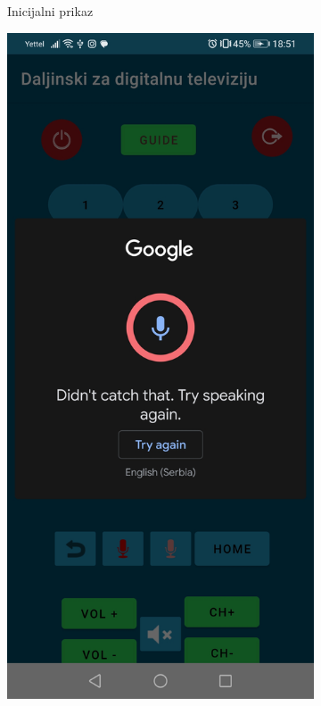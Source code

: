 \documentclass[implementacija.tex]{subfiles}
\begin{document}
\begin{figure}
\begin{subfigure}[b]{0.3\textwidth}
  \caption{Inicijalni prikaz}
   \label{fig:google_slusanje}
    \end{subfigure}
    \hfill
    \begin{subfigure}[b]{0.3\textwidth}
        \centering
        \includegraphics[width=\textwidth,keepaspectratio]{Implementacija/snimci_ekrana/11_obican_google_neuspesno.jpg}

\end{subfigure}
\end{figure}
\end{document}
